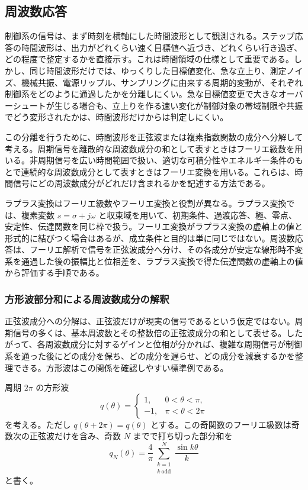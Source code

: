 \subsection{周波数応答}

制御系の信号は、まず時刻を横軸にした時間波形として観測される。ステップ応答の時間波形は、出力がどれくらい速く目標値へ近づき、どれくらい行き過ぎ、どの程度で整定するかを直接示す。これは時間領域の仕様として重要である。しかし、同じ時間波形だけでは、ゆっくりした目標値変化、急な立上り、測定ノイズ、機械共振、電源リップル、サンプリングに由来する周期的変動が、それぞれ制御系をどのように通過したかを分離しにくい。急な目標値変更で大きなオーバーシュートが生じる場合も、立上りを作る速い変化が制御対象の帯域制限や共振でどう変形されたかは、時間波形だけからは判定しにくい。

この分離を行うために、時間波形を正弦波または複素指数関数の成分へ分解して考える。周期信号を離散的な周波数成分の和として表すときはフーリエ級数を用いる。非周期信号を広い時間範囲で扱い、適切な可積分性やエネルギー条件のもとで連続的な周波数成分として表すときはフーリエ変換を用いる。これらは、時間信号にどの周波数成分がどれだけ含まれるかを記述する方法である。

ラプラス変換はフーリエ級数やフーリエ変換と役割が異なる。ラプラス変換では、複素変数 $s=\sigma+j\omega$ と収束域を用いて、初期条件、過渡応答、極、零点、安定性、伝達関数を同じ枠で扱う。フーリエ変換がラプラス変換の虚軸上の値と形式的に結びつく場合はあるが、成立条件と目的は単に同じではない。周波数応答は、フーリエ解析で信号を正弦波成分へ分け、その各成分が安定な線形時不変系を通過した後の振幅比と位相差を、ラプラス変換で得た伝達関数の虚軸上の値から評価する手順である。

\subsubsection{方形波部分和による周波数成分の解釈}

正弦波成分への分解は、正弦波だけが現実の信号であるという仮定ではない。周期信号の多くは、基本周波数とその整数倍の正弦波成分の和として表せる。したがって、各周波数成分に対するゲインと位相が分かれば、複雑な周期信号が制御系を通った後にどの成分を保ち、どの成分を遅らせ、どの成分を減衰するかを整理できる。方形波はこの関係を確認しやすい標準例である。

周期 $2\pi$ の方形波
\begin{equation}
  q(\theta)=
  \begin{cases}
    1, & 0<\theta<\pi,\\
    -1, & \pi<\theta<2\pi
  \end{cases}
\end{equation}
を考える。ただし $q(\theta+2\pi)=q(\theta)$ とする。この奇関数のフーリエ級数は奇数次の正弦波だけを含み、奇数 $N$ までで打ち切った部分和を
\begin{equation}
  q_N(\theta)=
  \frac{4}{\pi}\sum_{\substack{k=1\\k\ \mathrm{odd}}}^{N}
  \frac{\sin k\theta}{k}
  \label{eq:square-wave-fourier-partial}
\end{equation}
と書く。

